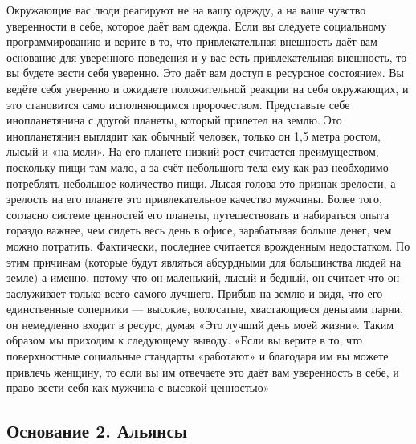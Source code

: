 Окружающие вас люди реагируют не на вашу одежду, а на ваше чувство уверенности в себе, которое даёт вам одежда. Если вы следуете социальному программированию и верите в то, что привлекательная внешность даёт вам основание для уверенного поведения и у вас есть привлекательная внешность, то вы будете вести себя уверенно. Это даёт вам доступ в ресурсное состояние». Вы ведёте себя уверенно и ожидаете положительной реакции на себя окружающих, и это становится само исполняющимся пророчеством. Представьте себе инопланетянина с другой планеты, который прилетел на землю. Это инопланетянин выглядит как обычный человек, только он 1,5 метра ростом, лысый и «на мели». На его планете низкий рост считается преимуществом, поскольку пищи там мало, а за счёт небольшого тела ему как раз необходимо потреблять небольшое количество пищи. Лысая голова это признак зрелости, а зрелость на его планете это привлекательное качество мужчины. Более того, согласно системе ценностей его планеты, путешествовать и набираться опыта гораздо важнее, чем сидеть весь день в офисе, зарабатывая больше денег, чем можно потратить. Фактически, последнее считается врожденным недостатком. По этим причинам (которые будут являться абсурдными для большинства людей на земле) а именно, потому что он маленький, лысый и бедный, он считает что он заслуживает только всего самого лучшего. Прибыв на землю и видя, что его единственные соперники --- высокие, волосатые, хвастающиеся деньгами парни, он немедленно входит в ресурс, думая «Это лучший день моей жизни». Таким образом мы приходим к следующему выводу. «Если вы верите в то, что поверхностные социальные стандарты «работают» и благодаря им вы можете привлечь женщину, то если вы им отвечаете это даёт вам уверенность в себе, и право вести себя как мужчина с высокой ценностью»

\subsection{Основание 2. Альянсы}

